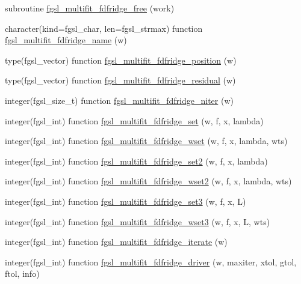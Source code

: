 \begin{DoxyCompactItemize}
subroutine \hyperlink{multifit_8finc_a0f2b7c3c1b3b7ae1300b344ba5c53bb6}{fgsl\+\_\+multifit\+\_\+fdfridge\+\_\+free} (work)
\item 
character(kind=fgsl\+\_\+char, len=fgsl\+\_\+strmax) function \hyperlink{multifit_8finc_ab62d531cf371c702d72cfdd2f58b418a}{fgsl\+\_\+multifit\+\_\+fdfridge\+\_\+name} (w)
\item 
type(fgsl\+\_\+vector) function \hyperlink{multifit_8finc_aacc93549278a79103747075228f67baf}{fgsl\+\_\+multifit\+\_\+fdfridge\+\_\+position} (w)
\item 
type(fgsl\+\_\+vector) function \hyperlink{multifit_8finc_a7c6f8e312fbe89d0de2e4813998d55cf}{fgsl\+\_\+multifit\+\_\+fdfridge\+\_\+residual} (w)
\item 
integer(fgsl\+\_\+size\+\_\+t) function \hyperlink{multifit_8finc_a8b7834d020cae35dbfce00a636256c58}{fgsl\+\_\+multifit\+\_\+fdfridge\+\_\+niter} (w)
\item 
integer(fgsl\+\_\+int) function \hyperlink{multifit_8finc_a19545c7742b242848272931428864f71}{fgsl\+\_\+multifit\+\_\+fdfridge\+\_\+set} (w, f, x, lambda)
\item 
integer(fgsl\+\_\+int) function \hyperlink{multifit_8finc_ab85cfbf7cba315ab64c72c5a092b133c}{fgsl\+\_\+multifit\+\_\+fdfridge\+\_\+wset} (w, f, x, lambda, wts)
\item 
integer(fgsl\+\_\+int) function \hyperlink{multifit_8finc_a93c551368c51e8c01e0255da855eb1d8}{fgsl\+\_\+multifit\+\_\+fdfridge\+\_\+set2} (w, f, x, lambda)
\item 
integer(fgsl\+\_\+int) function \hyperlink{multifit_8finc_a3f67a7de0da0cb5006f4c40642e93b65}{fgsl\+\_\+multifit\+\_\+fdfridge\+\_\+wset2} (w, f, x, lambda, wts)
\item 
integer(fgsl\+\_\+int) function \hyperlink{multifit_8finc_ac23df3ad7277ddab8e8303c98de428cf}{fgsl\+\_\+multifit\+\_\+fdfridge\+\_\+set3} (w, f, x, L)
\item 
integer(fgsl\+\_\+int) function \hyperlink{multifit_8finc_ad8e3a784af91b8d4cc39e75a7b54fea3}{fgsl\+\_\+multifit\+\_\+fdfridge\+\_\+wset3} (w, f, x, L, wts)
\item 
integer(fgsl\+\_\+int) function \hyperlink{multifit_8finc_a217424acf981104c4716edaa1f0325b2}{fgsl\+\_\+multifit\+\_\+fdfridge\+\_\+iterate} (w)
\item 
integer(fgsl\+\_\+int) function \hyperlink{multifit_8finc_ab813205d4b52c8c91c7310d4ec98bb3f}{fgsl\+\_\+multifit\+\_\+fdfridge\+\_\+driver} (w, maxiter, xtol, gtol, ftol, info)
\end{DoxyCompactItemize}


